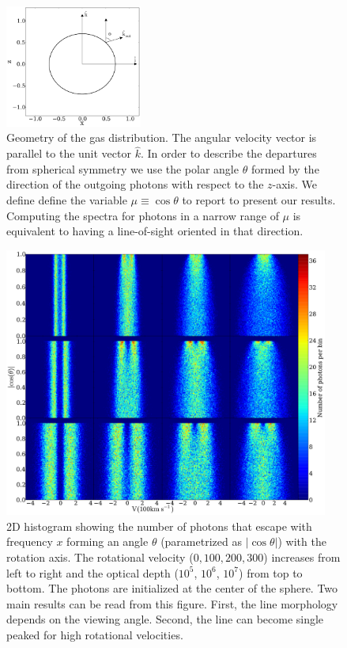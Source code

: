 \begin{figure}
\begin{center}
\includegraphics[width=0.4\textwidth]{../Figures/f1.pdf}
\end{center}
\caption{Geometry of the gas distribution. The angular velocity vector
is parallel to the unit vector $\hat{k}$. In order to describe the
departures from spherical symmetry we use the polar angle $\theta$
formed by the direction of the outgoing photons with respect to the
$z$-axis. We define define the variable $\mu\equiv\cos\theta$ to
report to present our results. Computing the spectra for photons in
a narrow range of $\mu$ is equivalent to having a line-of-sight
oriented in that direction.
\label{fig:geometry}}
\end{figure}
\begin{figure}
\begin{center}
\includegraphics[width=0.95\textwidth]{../Figures/f2.pdf}
\end{center}
\caption{
2D histogram showing the number of photons that escape with frequency
$x$ forming an angle $\theta$ (parametrized as $|\cos\theta|$) with the
rotation axis.
The rotational velocity ($0,100,200,300$\kms) increases from left to
right and the optical depth ($10^5$, $10^6$, $10^7$) from top to
bottom.
The \ly photons are initialized at the center of the sphere.
Two main results can be read from this figure.
First, the line morphology depends on the viewing angle.
Second, the line can become single peaked for high rotational
velocities.
\label{fig:CentralSpec} }
\end{figure}
